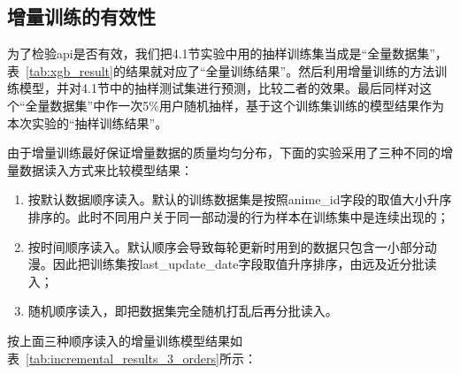    \subsection{增量训练的有效性}
    为了检验api是否有效，我们把4.1节实验中用的抽样训练集当成是“全量数据集”，表~\ref{tab:xgb_result}的结果就对应了“全量训练结果”。然后利用增量训练的方法训练模型，并对4.1节中的抽样测试集进行预测，比较二者的效果。最后同样对这个“全量数据集”中作一次5\%用户随机抽样，基于这个训练集训练的模型结果作为本次实验的“抽样训练结果”。

    由于增量训练最好保证增量数据的质量均匀分布，下面的实验采用了三种不同的增量数据读入方式来比较模型结果：
    \begin{enumerate}
      \item 按默认数据顺序读入。默认的训练数据集是按照anime\_id字段的取值大小升序排序的。此时不同用户关于同一部动漫的行为样本在训练集中是连续出现的；
      \item 按时间顺序读入。默认顺序会导致每轮更新时用到的数据只包含一小部分动漫。因此把训练集按last\_update\_date字段取值升序排序，由远及近分批读入；
      \item 随机顺序读入，即把数据集完全随机打乱后再分批读入。
    \end{enumerate}

    按上面三种顺序读入的增量训练模型结果如表~\ref{tab:incremental_results_3_orders}所示：
    \begin{table}[htbp]
      \centering
      \caption{不同读入数据顺序下增量训练的结果}
      \label{tab:incremental_results_3_orders}%
    \end{table}%

